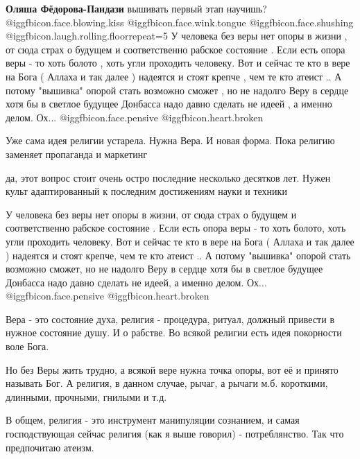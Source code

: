 \begin{itemize}
\begin{itemize} %
\textbf{Оляша Фёдорова-Пандази} вышивать первый этап научишь?  @igg{fbicon.face.blowing.kiss}  @igg{fbicon.face.wink.tongue}  @igg{fbicon.face.shushing}  @igg{fbicon.laugh.rolling.floor}{repeat=5} 
У человека без веры нет опоры в жизни , от сюда страх о будущем и соответственно рабское состояние .
Если есть опора веры - то хоть болото , хоть угли проходить человеку.
Вот и сейчас те кто в вере на Бога ( Аллаха и так далее ) надеятся и стоят крепче , чем те кто атеист ..
А потому "вышивка" опорой стать возможно сможет , но не надолго
Веру в сердце хотя бы в светлое будущее Донбасса надо давно сделать не идеей , а именно делом.
Ох... @igg{fbicon.face.pensive}  @igg{fbicon.heart.broken} 
\end{itemize} %


Уже сама идея религии устарела.
Нужна Вера. И новая форма.
Пока религию заменяет пропаганда и маркетинг

да, этот вопрос стоит очень остро последние несколько десятков лет. Нужен культ адаптированный к последним достижениям науки и техники


У человека без веры нет опоры в жизни, от сюда страх о будущем и соответственно рабское состояние .
Если есть опора веры - то хоть болото, хоть угли проходить человеку.
Вот и сейчас те кто в вере на Бога ( Аллаха и так далее ) надеятся и стоят крепче, чем те кто атеист ..
А потому "вышивка" опорой стать возможно сможет, но не надолго
Веру в сердце хотя бы в светлое будущее Донбасса надо давно сделать не идеей, а именно делом.
Ох... @igg{fbicon.face.pensive}  @igg{fbicon.heart.broken} 

\begin{itemize} %

Вера - это состояние духа, религия - процедура, ритуал, должный привести в
нужное состояние душу. И о рабстве. Во всякой религии есть идея покорности воле
Бога.

Но без Веры жить трудно, а всякой вере нужна точка опоры, вот её и принято
называть Бог. А религия, в данном случае, рычаг, а рычаги м.б. короткими,
длинными, прочными, гнилыми и т.д.

В общем, религия - это инструмент манипуляции сознанием, и самая господствующая
сейчас религия (как я выше говорил) - потреблянство. Так что предпочитаю
атеизм.


\end{itemize}
\end{itemize}
